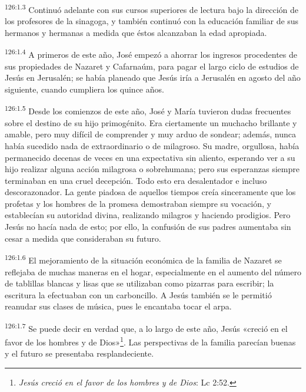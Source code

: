 \par 
\textsuperscript{126:1.3} Continuó adelante con sus cursos superiores de lectura bajo la dirección de los profesores de la sinagoga, y también continuó con la educación familiar de sus hermanos y hermanas a medida que éstos alcanzaban la edad apropiada.

\par 
\textsuperscript{126:1.4} A primeros de este año, José empezó a ahorrar los ingresos procedentes de sus propiedades de Nazaret y Cafarnaúm, para pagar el largo ciclo de estudios de Jesús en Jerusalén; se había planeado que Jesús iría a Jerusalén en agosto del año siguiente, cuando cumpliera los quince años.

\par 
\textsuperscript{126:1.5} Desde los comienzos de este año, José y María tuvieron dudas frecuentes sobre el destino de su hijo primogénito. Era ciertamente un muchacho brillante y amable, pero muy difícil de comprender y muy arduo de sondear; además, nunca había sucedido nada de extraordinario o de milagroso. Su madre, orgullosa, había permanecido decenas de veces en una expectativa sin aliento, esperando ver a su hijo realizar alguna acción milagrosa o sobrehumana; pero sus esperanzas siempre terminaban en una cruel decepción. Todo esto era desalentador e incluso descorazonador. La gente piadosa de aquellos tiempos creía sinceramente que los profetas y los hombres de la promesa demostraban siempre su vocación, y establecían su autoridad divina, realizando milagros y haciendo prodigios. Pero Jesús no hacía nada de esto; por ello, la confusión de sus padres aumentaba sin cesar a medida que consideraban su futuro.

\par 
\textsuperscript{126:1.6} El mejoramiento de la situación económica de la familia de Nazaret se reflejaba de muchas maneras en el hogar, especialmente en el aumento del número de tablillas blancas y lisas que se utilizaban como pizarras para escribir; la escritura la efectuaban con un carboncillo. A Jesús también se le permitió reanudar sus clases de música, pues le encantaba tocar el arpa.

\par 
\textsuperscript{126:1.7} Se puede decir en verdad que, a lo largo de este año, Jesús «creció en el favor de los hombres y de Dios»\footnote{\textit{Jesús creció en el favor de los hombres y de Dios}: Lc 2:52.}. Las perspectivas de la familia parecían buenas y el futuro se presentaba resplandeciente.

